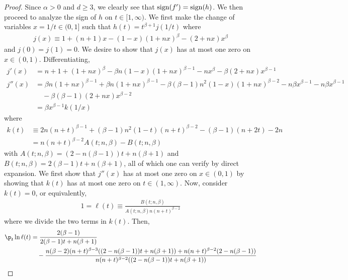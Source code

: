 \documentclass[11pt]{article}
\begin{document}
\begin{proof}
Since $\alpha>0$ and $d\geq 3$, we clearly see that ${\rm sign}(f')={\rm sign}(h)$. We then proceed to analyze the sign of $h$ on $t\in [1,\infty)$. We first make the change of variables $x=1/t\in (0,1]$ such that $h(t)=t^{\beta+1}j(1/t)$ where
\begin{align*}
    j(x)\equiv 1+(n+1)x-(1-x)(1+nx)^\beta -(2+nx)x^\beta 
\end{align*}
and $j(0)=j(1)=0$. We desire to show that $j(x)$ has at most one zero on $x\in (0,1)$. Differentiating,
\begin{align*}
    j'(x)&=n+1+(1+nx)^\beta -\beta n(1-x)(1+nx)^{\beta-1} -nx^\beta -\beta(2+nx)x^{\beta-1} \\
    j''(x)&=\beta n(1+nx)^{\beta-1}+\beta n (1+nx)^{\beta-1} -\beta(\beta-1)n^2 (1-x)(1+nx)^{\beta-2} -n\beta x^{\beta-1}-n\beta x^{\beta-1}\\
    &\quad -\beta(\beta-1)(2+nx)x^{\beta-2}\\
    &=\beta x^{\beta-1}k(1/x)
\end{align*}
where
\begin{align*}
    k(t)&\equiv 2n(n+t)^{\beta-1}+(\beta-1)n^2 (1-t)(n+t)^{\beta-2}-(\beta-1)(n+2t)-2n\\
    &=n(n+t)^{\beta-2}A(t;n,\beta)-B(t;n,\beta)
\end{align*}
with $A(t;n,\beta)=(2-n(\beta-1))t+n(\beta+1)$ and $B(t;n,\beta)=2(\beta-1)t+n(\beta+1)$, all of which one can verify by direct expansion.
We first show that $j''(x)$ has at most one zero on $x\in (0,1)$ by showing that $k(t)$ has at most one zero on $t\in (1,\infty)$. Now, consider $k(t)=0$, or equivalently,
\begin{align*}
    1=\ell(t)\equiv \frac{B(t;n,\beta)}{A(t;n,\beta)n(n+t)^{\beta-2}}
\end{align*}
where we divide the two terms in $k(t)$. Then, 
\begin{align*}
    \p_t \ln \ell(t)&=\frac{2(\beta-1)}{2(\beta-1)t+n(\beta+1)} \\&\quad -\frac{n(\beta-2)(n+t)^{\beta-3}((2-n(\beta-1))t+n(\beta+1))+n(n+t)^{\beta-2}(2-n(\beta-1))}{n(n+t)^{\beta-2}((2-n(\beta-1))t+n(\beta+1))}\\

\end{align*}
\end{proof}
\end{document}
